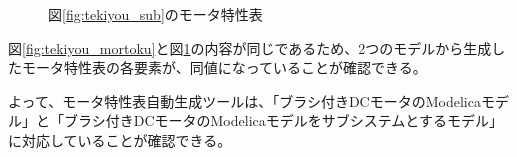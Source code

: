 \begin{figure}[t]
	\centering
	\caption{図\ref{fig:tekiyou_sub}のモータ特性表}
	\label{fig:sub_mortoku}
\end{figure}

図\ref{fig:tekiyou_mortoku}と図\ref{fig:sub_mortoku}の内容が同じであるため、2つのモデルから生成したモータ特性表の各要素が、同値になっていることが確認できる。

よって、モータ特性表自動生成ツールは、「ブラシ付きDCモータのModelicaモデル」と「ブラシ付きDCモータのModelicaモデルをサブシステムとするモデル」に対応していることが確認できる。